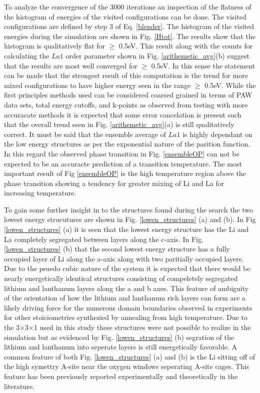 \documentclass[aps,pre,reprint,superscriptaddress,showkeys]{revtex4-1}
\begin{document}
To analyze the convergence of the 3000 iterations an inspection of the flatness of the histogram of energies of the visited configurations can be done. The visited configurations are defined by step 3 of Eq. \ref{blender}. The histogram of the visited energies during the simulation are shown in Fig. \ref{Htot}. The results show that  the histogram is qualitatively flat for $\ge$ 0.5eV. This result along with the counts for calculating the $La1$ order parameter shown in Fig. \ref{arithemetic_avg}(b) suggest that the results are most well converged for $\ge$ 0.5eV. In this sense the statement can be made that the strongest result of this computation is the trend for more mixed configurations to have higher energy seen in the range $\ge$ 0.5eV. While the first principles methods used can be considered coarsed grained in terms of PAW data sets, total energy cutoffs, and k-points as observed from testing with more accuracate methods it is expected that some error cancelation is present such that the overall trend seen in Fig. \ref{arithemetic_avg}(a) is still qualitatively correct. It must be said that the ensemble average of $La1$ is highly dependant on the low energy structures as per the exponential nature of the parition function. In this regard the observed phase transition in Fig. \ref{ensembleOP} can not be expected to be an accuracte prediction of a transition temperature. The most important result of Fig \ref{ensembleOP} is the high temperature region above the phase transition showing a tendency for greater mixing of Li and La for increasing temperature. 

To gain some further insight in to the structures found during the search the two lowest energy strucutures are  shown in  Fig. \ref{lowen_structures} (a) and (b). In Fig \ref{lowen_structures} (a) it is seen that the lowest energy structure has the Li and La completely segregated between layers along the c-axis. In Fig.  \ref{lowen_structures} (b) that the second lowest energy structure has a fully occupied layer of Li along the a-axis along with two paritially occupied layers.  Due to the psuedo cubic nature of the system it is expected that there would be nearly energetically identical structures  consisting of compeletely segregated lithium and lanthanum layers along the a and b axes. This feature of ambiguity of the orientation of how the lithium and lanthanum rich layers can form  are a likely driving force for the numerous domain boundaries observed in experiments for other stoiciometries synthezied by annealing from high temperature\cite{imaginary_phonons,domainboundaries}. Due to the 3$\times$3$\times$1 used in this study these structures were not possible to realize in the simulation but as evidenced by Fig.  \ref{lowen_structures} (b) segration of the lithium and lanthanum into seperate layers is still energetically favorable. A common feature of both Fig. \ref{lowen_structures} (a) and (b) is the Li sitting off of the high symettry A-site near the oxygen windows seperating A-site cages. This feature has been previously reported experimentally and theoretically in the literature\cite{Asitedistribution,imaginary_phonons,Li_La_ordering_computational}. 
\end{document}
